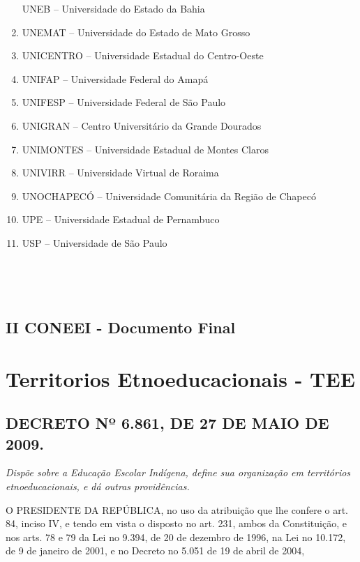\documentclass[
]{book}
\begin{document}
\begin{enumerate}
  UNEB -- Universidade do Estado da Bahia
\item
  UNEMAT -- Universidade do Estado de Mato Grosso
\item
  UNICENTRO -- Universidade Estadual do Centro-Oeste
\item
  UNIFAP -- Universidade Federal do Amapá
\item
  UNIFESP -- Universidade Federal de São Paulo
\item
  UNIGRAN -- Centro Universitário da Grande Dourados
\item
  UNIMONTES -- Universidade Estadual de Montes Claros
\item
  UNIVIRR -- Universidade Virtual de Roraima
\item
  UNOCHAPECÓ -- Universidade Comunitária da Região de Chapecó
\item
  UPE -- Universidade Estadual de Pernambuco
\item
  USP -- Universidade de São Paulo
\end{enumerate}

~

~

\hypertarget{ii-coneei---documento-final}{%
\section{II CONEEI - Documento Final}\label{ii-coneei---documento-final}}

\hypertarget{territorios-etnoeducacionais---tee}{%
\chapter{Territorios Etnoeducacionais - TEE}\label{territorios-etnoeducacionais---tee}}

\hypertarget{decreto-nuxba-6.861-de-27-de-maio-de-2009.}{%
\section{DECRETO Nº 6.861, DE 27 DE MAIO DE 2009.}\label{decreto-nuxba-6.861-de-27-de-maio-de-2009.}}

\emph{Dispõe sobre a Educação Escolar Indígena, define sua organização em territórios etnoeducacionais, e dá outras providências.}

O PRESIDENTE DA REPÚBLICA, no uso da atribuição que lhe confere o art. 84, inciso IV, e tendo em vista o disposto no art. 231, ambos da Constituição, e nos arts. 78 e 79 da Lei no 9.394, de 20 de dezembro de 1996, na Lei no 10.172, de 9 de janeiro de 2001, e no Decreto no 5.051 de 19 de abril de 2004,
\end{document}
